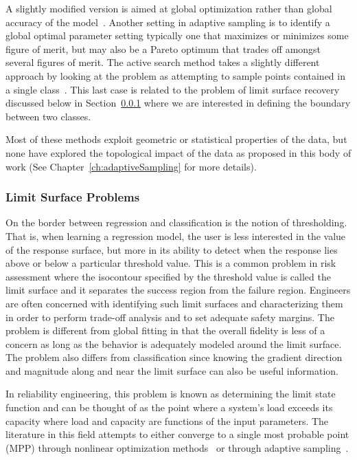 A slightly modified version is aimed at global optimization rather than global accuracy of the model~\cite{MooreSchneider1996,JonesSchonlauWelch1998}.
%
Another setting in adaptive sampling is to identify a global optimal parameter setting typically one that maximizes or minimizes some figure of merit, but may also be a Pareto optimum that trades off amongst several figures of merit.
%
The active search method takes a slightly different approach by looking at the problem as attempting to sample points contained in a single class~\cite{GarnettKrishnamurthyXiong2012}.
%
This last case is related to the problem of limit surface recovery discussed below in Section~\ref{sec:limitSurface} where we are interested in defining the boundary between two classes.

Most of these methods exploit geometric or statistical properties of the data, but none have explored the topological impact of the data as proposed in this body of work (See Chapter~\ref{ch:adaptiveSampling} for more details).

\subsubsection{Limit Surface Problems}
\label{sec:limitSurface}

On the border between regression and classification is the notion of thresholding.
%
That is, when learning a regression model, the user is less interested in the value of the response surface, but more in its ability to detect when the response lies above or below a particular threshold value.
%
This is a common problem in risk assessment where the isocontour specified by the threshold value is called the limit surface and it separates the success region from the failure region.
%
Engineers are often concerned with identifying such limit surfaces and characterizing them in order to perform trade-off analysis and to set adequate safety margins.
%
The problem is different from global fitting in that the overall fidelity is less of a concern as long as the behavior is adequately modeled around the limit surface.
%
The problem also differs from classification since knowing the gradient direction and magnitude along and near the limit surface can also be useful information.

In reliability engineering, this problem is known as determining the limit state function and can be thought of as the point where a system's load exceeds its capacity where load and capacity are functions of the input parameters.
%
The literature in this field attempts to either converge to a single most probable point (MPP) through nonlinear optimization methods~\cite{EldredBichon2006,EldredAgarwalPerez2007} or through adaptive sampling~\cite{Wu1994,DeyMahadevan1998,ZouMahadevanMourelatos2002,
BichonEldredSwiler2008}.

